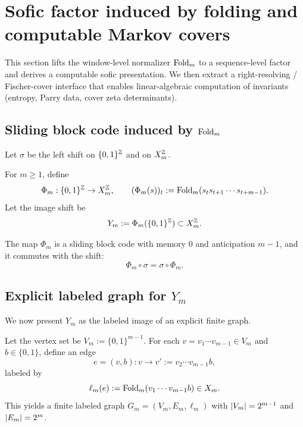 \section{Sofic factor induced by folding and computable Markov covers}\label{sec:sofic-cover}

This section lifts the window-level normalizer $\mathrm{Fold}_m$ to a sequence-level factor and derives a computable sofic presentation.
We then extract a right-resolving / Fischer-cover interface that enables linear-algebraic computation of invariants (entropy, Parry data, cover zeta determinants).

\subsection{Sliding block code induced by $\mathrm{Fold}_m$}\label{subsec:phi-def}
Let $\sigma$ be the left shift on $\{0,1\}^{\mathbb{Z}}$ and on $X_m^{\mathbb{Z}}$.

\begin{definition}\label{def:Phi_m}
For $m\ge 1$, define
\[
\Phi_m:\{0,1\}^{\mathbb{Z}}\to X_m^{\mathbb{Z}},\qquad (\Phi_m(s))_t:=\mathrm{Fold}_m(s_t s_{t+1}\cdots s_{t+m-1}).
\]
Let the image shift be
\[
Y_m:=\Phi_m(\{0,1\}^{\mathbb{Z}})\subset X_m^{\mathbb{Z}}.
\]
\end{definition}

\begin{proposition}\label{prop:phi-radius-equiv}
The map $\Phi_m$ is a sliding block code with memory $0$ and anticipation $m-1$, and it commutes with the shift:
\[
\Phi_m\circ\sigma=\sigma\circ\Phi_m.
\]
\end{proposition}

\subsection{Explicit labeled graph for $Y_m$}\label{subsec:Gm}
We now present $Y_m$ as the labeled image of an explicit finite graph.

\begin{definition}\label{def:G_m}
Let the vertex set be $V_m:=\{0,1\}^{m-1}$.
For each $v=v_1\cdots v_{m-1}\in V_m$ and $b\in\{0,1\}$, define an edge
\[
e=(v,b): v\to v':=v_2\cdots v_{m-1}b,
\]
labeled by
\[
\ell_m(e):=\mathrm{Fold}_m(v_1\cdots v_{m-1}b)\in X_m.
\]
This yields a finite labeled graph $G_m=(V_m,E_m,\ell_m)$ with $\left\lvert V_m\right\rvert=2^{m-1}$ and $\left\lvert E_m\right\rvert=2^m$.
\end{definition}

